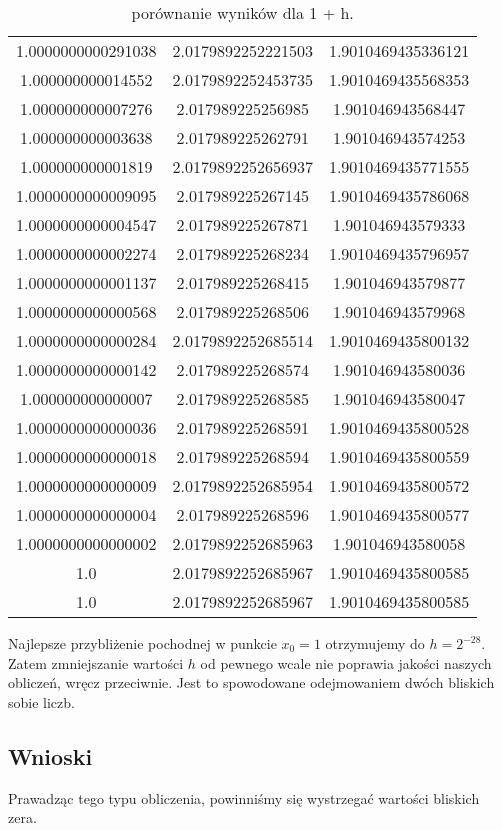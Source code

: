 \documentclass{article}
\begin{document}
\begin{center}
\begin{table}[h!]
\begin{tabular}{||c c c||}
     1.0000000000291038 & 2.0179892252221503 & 1.9010469435336121 \\ 
     1.000000000014552 & 2.0179892252453735 & 1.9010469435568353 \\ 
     1.000000000007276 & 2.017989225256985 & 1.901046943568447 \\ 
     1.000000000003638 & 2.017989225262791 & 1.901046943574253 \\ 
     1.000000000001819 & 2.0179892252656937 & 1.9010469435771555 \\ 
     1.0000000000009095 & 2.017989225267145 & 1.9010469435786068 \\ 
     1.0000000000004547 & 2.017989225267871 & 1.901046943579333 \\ 
     1.0000000000002274 & 2.017989225268234 & 1.9010469435796957 \\ 
     1.0000000000001137 & 2.017989225268415 & 1.901046943579877 \\ 
     1.0000000000000568 & 2.017989225268506 & 1.901046943579968 \\ 
     1.0000000000000284 & 2.0179892252685514 & 1.9010469435800132 \\ 
     1.0000000000000142 & 2.017989225268574 & 1.901046943580036\\ 
     1.000000000000007 & 2.017989225268585 & 1.901046943580047 \\ 
     1.0000000000000036 & 2.017989225268591 & 1.9010469435800528 \\ 
     1.0000000000000018 & 2.017989225268594 & 1.9010469435800559 \\ 
     1.0000000000000009 & 2.0179892252685954 & 1.9010469435800572 \\ 
     1.0000000000000004 & 2.017989225268596 & 1.9010469435800577 \\ 
     1.0000000000000002 & 2.0179892252685963 & 1.901046943580058 \\ 
     1.0 & 2.0179892252685967 & 1.9010469435800585 \\ 
     1.0 & 2.0179892252685967 & 1.9010469435800585 \\ 
     \hline
     \end{tabular}
     \caption{porównanie wyników dla 1 + h.}
     \label{table:7}
     \end{table}

    \large Najlepsze przybliżenie pochodnej w punkcie \(x_{0} = 1\) otrzymujemy do \(h = 2^{-28}\).
     Zatem zmniejszanie wartości \(h\) od pewnego wcale nie poprawia jakości naszych obliczeń, wręcz przeciwnie.
     Jest to spowodowane odejmowaniem dwóch bliskich sobie liczb.
    \subsection{Wnioski}
    \large Prawadząc tego typu obliczenia, powinniśmy się wystrzegać wartości bliskich zera.


    \end{center}
\end{document}
